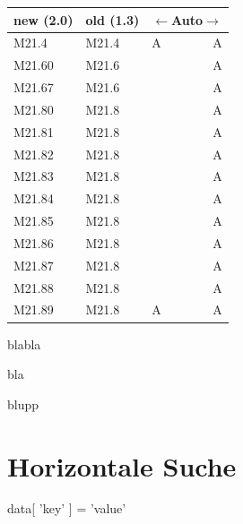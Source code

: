 \begin{minipage}[t]{.5\textwidth}\vspace{0pt}
%
\begingroup
\renewcommand{\arraystretch}{1.2}
\begin{tabular}[t]{p{58pt}p{58pt}lr}
new (2.0) & old (1.3) & \multicolumn{2}{c}{$\leftarrow$Auto$\rightarrow$} \\
\hline
M21.4 & M21.4 & A & A \\
\hdashline[0.5pt/5pt]
M21.60 & M21.6 &  & A \\
M21.67 & M21.6 &  & A \\
\hdashline[0.5pt/5pt]
M21.80 & M21.8 &  & A \\
M21.81 & M21.8 &  & A \\
M21.82 & M21.8 &  & A \\
M21.83 & M21.8 &  & A \\
M21.84 & M21.8 &  & A \\
M21.85 & M21.8 &  & A \\
M21.86 & M21.8 &  & A \\
M21.87 & M21.8 &  & A \\
M21.88 & M21.8 &  & A \\
M21.89 & M21.8 & A & A \\
\end{tabular}
\endgroup
%
\end{minipage}

blabla

\begin{minipage}[t]{.5\textwidth}
bla
\end{minipage}
\begin{minipage}[t]{.5\textwidth}
blupp
\end{minipage}

\section{Horizontale Suche}



data[ 'key' ] = 'value'

